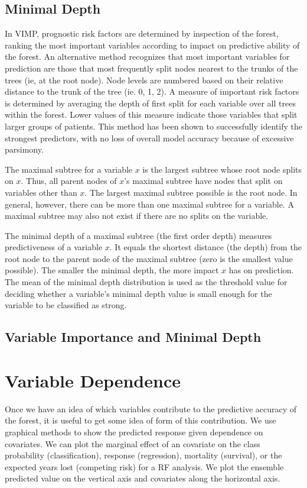 \documentclass[nojss]{jss}\usepackage[]{graphicx}\usepackage[]{color}
\begin{document}
\subsection{Minimal Depth}\label{S:minimalDepth}
In VIMP, prognostic risk factors are determined by inspection of the forest, ranking the most important variables according to impact on predictive ability of the forest. An alternative method recognizes that most important variables for prediction are those that most frequently split nodes nearest to the trunks of the trees (ie, at the root node). Node levels are numbered based on their relative distance to the trunk of the tree (ie. 0, 1, 2).  A measure of important risk factors is determined by averaging the depth of first split for each variable over all trees within the forest. Lower values of this measure indicate those variables that split larger groups of patients. This method has been shown to successfully identify the strongest predictors, with no loss of overall model accuracy because of excessive parsimony.

The maximal subtree for a variable $x$ is the largest subtree whose root node splits on $x$. Thus, all parent nodes of $x$'s maximal subtree have nodes that split on variables other than $x$. The largest maximal subtree possible is the root node. In general, however, there can be more than one maximal subtree for a variable. A maximal subtree may also not exist if there are no splits on the variable.

The minimal depth of a maximal subtree (the first order depth) measures predictiveness of a variable $x$. It equals the shortest distance (the depth) from the root node to the parent node of the maximal subtree (zero is the smallest value possible). The smaller the minimal depth, the more impact $x$ has on prediction. The mean of the minimal depth distribution is used as the threshold value for deciding whether a variable's minimal depth value is small enough for the variable to be classified as strong. 


\subsection{Variable Importance and Minimal Depth}

\section{Variable Dependence}
Once we have an idea of which variables contribute to the predictive accuracy of the forest, it is useful to get some idea of form of this contribution. We use graphical methods to show the predicted response given dependence on covariates. We can plot the marginal effect of an covariate on the class probability (classification), response (regression), mortality (survival), or the expected years lost (competing risk) for a RF analysis. We plot the ensemble predicted value on the vertical axis and covariates along the horizontal axis.
\end{document}
